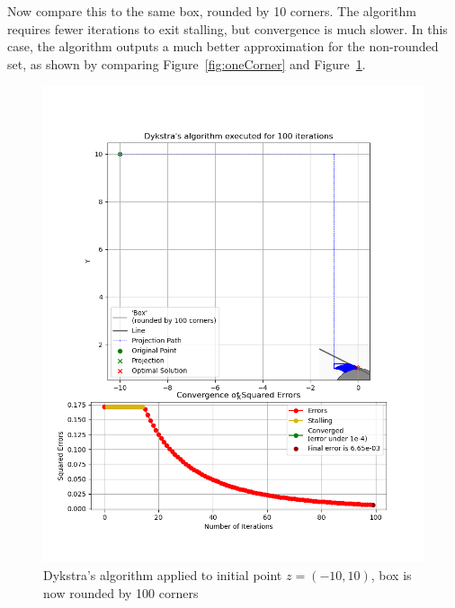 \documentclass[hidelinks]{article}
\begin{document}
\par Now compare this to the same box, rounded by 10 corners. The algorithm requires fewer iterations to exit stalling, but convergence is much slower. In this case, the algorithm outputs a much better approximation for the non-rounded set, as shown by comparing Figure~\ref{fig:oneCorner} and Figure~\ref{fig:hundredCorners}.
%
\begin{figure}[h!]
    \centering
    
    \includegraphics[width=1\textwidth]{Latex/Current Version/Figures/hundred_corners_rounding.png}
    \caption{Dykstra's algorithm applied to initial point $z = (-10, 10)$, box is now rounded by 100 corners}
    \label{fig:hundredCorners}

\end{figure}
\newpage
%
\end{document}
